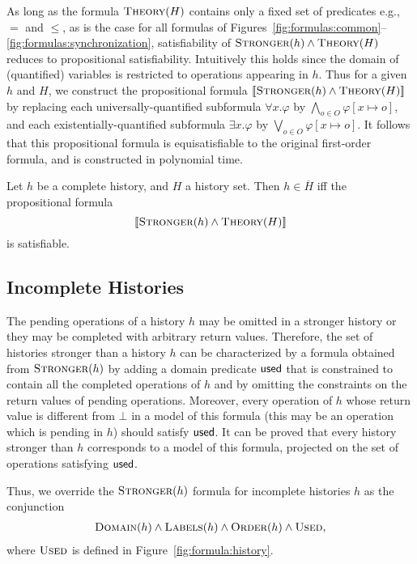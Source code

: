 As long as the formula $\textsc{Theory}(H)$ contains only a fixed set of
predicates e.g.,~$=$ and $\leq$, as is the case for all formulas of
Figures~\ref{fig:formulas:common}--\ref{fig:formulas:synchronization},
satisfiability of $\textsc{Stronger}(h) \land \textsc{Theory}(H)$ reduces to
propositional satisfiability. Intuitively this holds since the domain of
(quantified) variables is restricted to operations appearing in $h$. Thus for a
given $h$ and $H$, we construct the propositional formula
$[\![{\textsc{Stronger}(h) \land \textsc{Theory}(H)}]\!]$ by replacing each
universally-quantified subformula $\forall x. \varphi$ by $\bigwedge_{o \in O} \varphi[x
\mapsto o]$, and each existentially-quantified subformula $\exists x. \varphi$ by
$\bigvee_{o \in O} \varphi[x \mapsto o]$. It follows that this propositional formula is
equisatisfiable to the original first-order formula, and is constructed in
polynomial time.

\begin{corollary}
  \label{cor:satisfiability_complete}

  Let $h$ be a complete history, and $H$ a history set.
  Then $h \in \overline{H}$ if{f} the propositional formula
  $$[\![{\textsc{Stronger}(h) \land \textsc{Theory}(H)}]\!]$$
  is satisfiable.

\end{corollary}

\subsection{Incomplete Histories}
\label{sec:propositional:pending}

The pending operations of a history $h$ may be omitted in a stronger history or
they may be completed with arbitrary return values. Therefore, the set of
histories stronger than a history $h$ can be characterized by a formula
obtained from $\textsc{Stronger}(h)$ by adding a domain predicate ${\sf used}$
that is constrained to contain all the completed operations of $h$ and by
omitting the constraints on the return values of pending operations. Moreover,
every operation of $h$ whose return value is different from $\bot$ in a model
of this formula (this may be an operation which is pending in $h$) should
satisfy ${\sf used}$. It can be proved that every history stronger than $h$
corresponds to a model of this formula, projected on the set of operations
satisfying ${\sf used}$.

Thus, we override the $\textsc{Stronger}(h)$ formula for incomplete histories
$h$ as the conjunction
\begin{align*}
  \textsc{Domain}(h) \land \textsc{Labels}(h) \land \textsc{Order}(h) \land \textsc{Used},
\end{align*}
where $\textsc{Used}$ is defined in Figure~\ref{fig:formula:history}.

